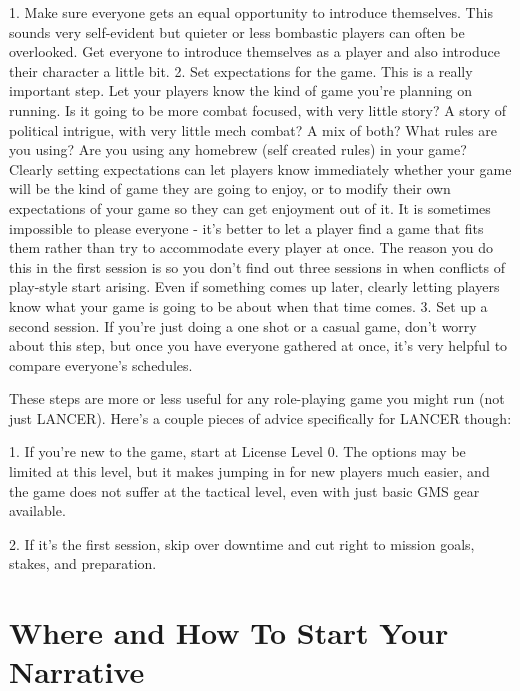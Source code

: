              1.  Make sure everyone gets an equal opportunity to introduce themselves. This
                 sounds very self-evident but quieter or less bombastic players can often be
                 overlooked. Get everyone to introduce themselves as a player and also introduce
                 their character a little bit.
             2.  Set expectations for the game. This is a really important step. Let your players
                 know the kind of game you’re planning on running. Is it going to be more combat
                 focused, with very little story? A story of political intrigue, with very little mech
                 combat? A mix of both? What rules are you using? Are you using any homebrew
                 (self created rules) in your game? Clearly setting expectations can let players
                 know immediately whether your game will be the kind of game they are going to
                 enjoy, or to modify their own expectations of your game so they can get
                 enjoyment out of it. It is sometimes impossible to please everyone - it’s better to
                 let a player find a game that fits them rather than try to accommodate every player
                 at once. The reason you do this in the first session is so you don’t find out three
                 sessions in when conflicts of play-style start arising. Even if something comes up
                 later, clearly letting players know what your game is going to be about when that
                 time comes.
             3.  Set up a second session. If you’re just doing a one shot or a casual game, don’t
                 worry about this step, but once you have everyone gathered at once, it’s very
                 helpful to compare everyone’s schedules.

These steps are more or less useful for any role-playing game you might run (not just LANCER).
Here’s a couple pieces of advice specifically for LANCER though:


         	1. If you’re new to the game, start at License Level 0. The options may be limited at this
         level, but it makes jumping in for new players much easier, and the game does not suffer
         at the tactical level, even with just basic GMS gear available.

         	2. If it’s the first session, skip over downtime and cut right to mission goals, stakes, and
         preparation.

\section{Where and How To Start Your Narrative}

